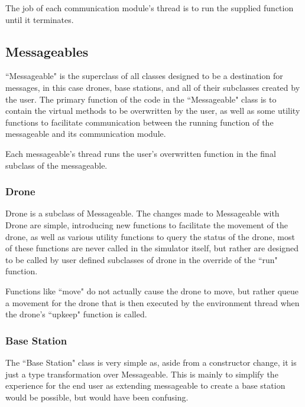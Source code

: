 		The job of each communication module's thread is to run the supplied function until it terminates.

	\subsection{Messageables}
		``Messageable" is the superclass of all classes designed to be a destination for messages, in this case
		drones, base stations, and all of their subclasses created by the user. The primary function of the
		code in the ``Messageable" class is to contain the virtual methods to be overwritten by the user, as
		well as some utility functions to facilitate communication between the running function of the messageable
		and its communication module.

		Each messageable's thread runs the user's overwritten function in the final subclass of the messageable.

		\subsubsection{Drone}
			Drone is a subclass of Messageable. The changes made to Messageable with Drone are simple, introducing
			new functions to facilitate the movement of the drone, as well as various utility functions to query the
			status of the drone, most of these functions are never called in the simulator itself, but rather are
			designed to be called by user defined subclasses of drone in the override of the ``run" function.

			Functions like ``move" do not actually cause the drone to move, but rather queue a movement for the drone
			that is then executed by the environment thread when the drone's ``upkeep" function is called.

		\subsubsection{Base Station}
			The ``Base Station" class is very simple as, aside from a constructor change, it is just a type transformation
			over Messageable. This is mainly to simplify the experience for the end user as extending messageable to create
			a base station would be possible, but would have been confusing.

